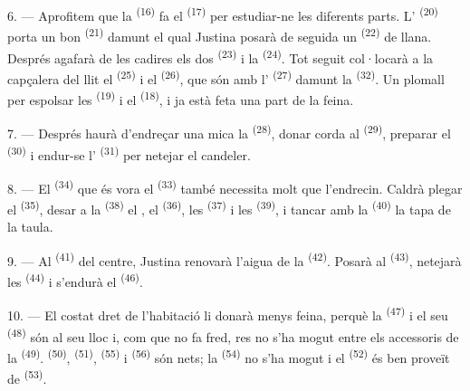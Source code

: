 6. --- Aprofitem que la  \textsuperscript{(16)} fa el
 \textsuperscript{(17)} per estudiar-ne les diferents parts.
L' \textsuperscript{(20)} porta un bon 
\textsuperscript{(21)} damunt el qual Justina posarà de seguida un
 \textsuperscript{(22)} de llana. Després agafarà de les cadires
els dos  \textsuperscript{(23)} i la 
\textsuperscript{(24)}. Tot seguit col·locarà a la capçalera del llit el
 \textsuperscript{(25)} i el 
\textsuperscript{(26)}, que són amb l' \textsuperscript{(27)} damunt la
 \textsuperscript{(32)}. Un plomall per espolsar les 
\textsuperscript{(19)} i el  \textsuperscript{(18)}, i ja està feta una part de
la feina.

7. --- Després haurà d'endreçar una mica la  \textsuperscript{(28)},
donar corda al  \textsuperscript{(29)}, preparar el 
\textsuperscript{(30)} i endur-se l' \textsuperscript{(31)} per netejar el
candeler.

\VUsaut{5.0mm}
\VUsaut{3.0mm}

8. --- El  \textsuperscript{(34)} que és vora el 
\textsuperscript{(33)} també necessita molt que l'endrecin. Caldrà plegar el
 \textsuperscript{(35)}, desar a la 
\textsuperscript{(38)} el , el  \textsuperscript{(36)}, les
 \textsuperscript{(37)} i les  \textsuperscript{(39)}, i
tancar amb la  \textsuperscript{(40)} la tapa de la taula.

9. --- Al  \textsuperscript{(41)} del centre, Justina renovarà l'aigua de la
 \textsuperscript{(42)}. Posarà  al
 \textsuperscript{(43)}, netejarà les 
\textsuperscript{(44)} i s'endurà el  \textsuperscript{(46)}.

10. --- El costat dret de l'habitació li donarà menys feina, perquè la
 \textsuperscript{(47)} i el seu 
\textsuperscript{(48)} són al seu lloc i, com que no fa fred, res no s'ha mogut entre els
accessoris de la  \textsuperscript{(49)}.
 \textsuperscript{(50)},  \textsuperscript{(51)},
 \textsuperscript{(55)} i 
\textsuperscript{(56)} són nets; la  \textsuperscript{(54)} no s'ha
mogut i el  \textsuperscript{(52)} és ben proveït de
 \textsuperscript{(53)}.

